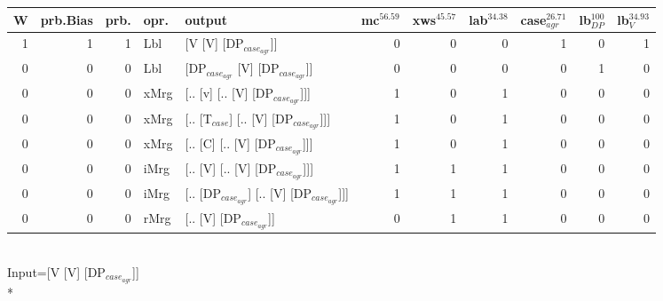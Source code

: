 \begin{tabularx}{\linewidth}{rrrlXrrrrrr}
\hline
   W &   prb.Bias &   prb. & opr.   & output                                    &   mc$^{56.59}$ &   xws$^{45.57}$ &   lab$^{34.38}$ &   case$_{agr}^{26.71}$ &   lb$_{DP}^{100}$ &   lb$_{V}^{34.93}$ \\
\hline
   1 &       1 &   1 & Lbl  & [V [V] [DP$_{case_{agr}}$]]                     &            0 &             0 &             0 &                  1 &                0 &              1 \\
   0 &       0 &   0 & Lbl  & [DP$_{case_{agr}}$ [V] [DP$_{case_{agr}}$]]           &            0 &             0 &             0 &                  0 &                1 &              0 \\
   0 &       0 &   0 & xMrg & [.. [v] [.. [V] [DP$_{case_{agr}}$]]]           &            1 &             0 &             1 &                  0 &                0 &              0 \\
   0 &       0 &   0 & xMrg & [.. [T$_{case}$] [.. [V] [DP$_{case_{agr}}$]]]      &            1 &             0 &             1 &                  0 &                0 &              0 \\
   0 &       0 &   0 & xMrg & [.. [C] [.. [V] [DP$_{case_{agr}}$]]]           &            1 &             0 &             1 &                  0 &                0 &              0 \\
   0 &       0 &   0 & iMrg & [.. [V] [.. [V] [DP$_{case_{agr}}$]]]           &            1 &             1 &             1 &                  0 &                0 &              0 \\
   0 &       0 &   0 & iMrg & [.. [DP$_{case_{agr}}$] [.. [V] [DP$_{case_{agr}}$]]] &            1 &             1 &             1 &                  0 &                0 &              0 \\
   0 &       0 &   0 & rMrg & [.. [V] [DP$_{case_{agr}}$]]                    &            0 &             1 &             1 &                  0 &                0 &              0 \\
\hline
\end{tabularx}\endgroup\\
\begingroup\scriptsize Input=[V [V] [DP$_{case_{agr}}$]]\\*
